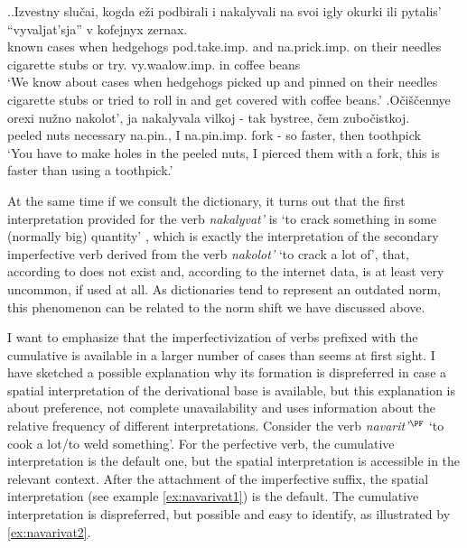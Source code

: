 \ex.\label{ex:nakalyvat}\ag.Izvestny slu\v{c}ai, kogda e\v{z}i podbirali i nakalyvali na svoi igly okurki ili pytalis' ``vyvaljat'sja'' v kofejnyx zernax.\\
known cases when hedgehogs pod.take.imp. and na.prick.imp. on their needles {cigarette stubs} or try. vy.waalow.imp. in coffee beans\\
\trans `We know about cases when hedgehogs picked up and pinned on their needles cigarette stubs or tried to roll in and get covered with coffee beans.'
\bg.O\v{c}i\v{s}\v{c}ennye orexi nu\v{z}no nakolot', ja nakalyvala vilkoj - tak bystree, \v{c}em zubo\v{c}istkoj.\\
peeled nuts necessary na.pin., I na.pin.imp. fork - so faster, then toothpick\\
\trans `You have to make holes in the peeled nuts, I pierced them with a fork, this is faster than using a toothpick.'\\

At the same time if we consult the dictionary, it turns out that the first interpretation provided for the verb \textit{nakalyvat'} is `to crack something in some (normally big) quantity' \citep{Efremova:00}, which is exactly the interpretation of the secondary imperfective verb derived from the verb \textit{nakolot'} `to crack a lot of', that, according to \citet{Svenonius:04b} does not exist and, according to the internet data, is at least very uncommon, if used at all. As dictionaries tend to represent an outdated norm, this phenomenon can be related to the norm shift we have discussed above.

I want to emphasize that the imperfectivization of verbs prefixed with the cumulative  is available in a larger number of cases than seems at first sight. I have sketched a possible explanation why its formation is dispreferred in case a spatial interpretation of the derivational base is available, but this explanation is about preference, not complete unavailability and uses information about the relative frequency of different interpretations. Consider the verb \textit{navarit'}$^{\PF}$ `to cook a lot/to weld something'. For the perfective verb, the cumulative interpretation is the default one, but the spatial interpretation is accessible in the relevant context. After the attachment of the imperfective suffix, the spatial interpretation (see example \ref{ex:navarivat1}) is the default. The cumulative interpretation is dispreferred, but possible and easy to identify, as illustrated by \ref{ex:navarivat2}.

